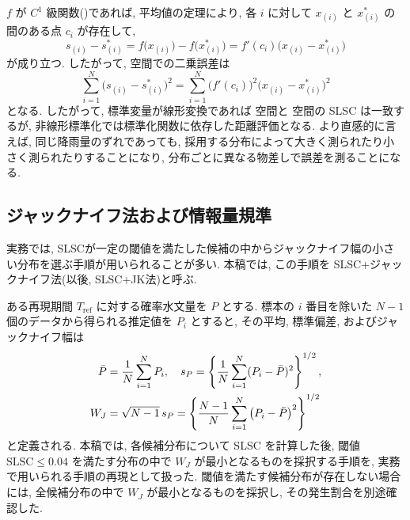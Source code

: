 $f$ が $C^1$ 級関数()であれば, 平均値の定理により, 各 $i$ に対して $x_{(i)}$ と $x_{(i)}^{\ast}$ の間のある点 $c_i$ が存在して,
\begin{equation}
s_{(i)}-s_{(i)}^{\ast} =
f\bigl(x_{(i)}\bigr)-f\bigl(x_{(i)}^{\ast}\bigr)
= f'(c_i)\bigl(x_{(i)}-x_{(i)}^{\ast}\bigr)
\label{eq:mvt}
\end{equation}
が成り立つ.
したがって, \Ssp 空間での二乗誤差は
\begin{equation}
\sum_{i=1}^{N}\bigl(s_{(i)}-s_{(i)}^{\ast}\bigr)^2
=
\sum_{i=1}^{N}\bigl(f'(c_i)\bigr)^2\bigl(x_{(i)}-x_{(i)}^{\ast}\bigr)^2
\label{eq:weightednorm}
\end{equation}
となる. 
したがって, 標準変量が線形変換であれば \Ssp 空間と \Xsp 空間の SLSC は一致するが, 非線形標準化では標準化関数に依存した距離評価となる.
より直感的に言えば, 同じ降雨量のずれであっても, 採用する分布によって大きく測られたり小さく測られたりすることになり, 分布ごとに異なる物差しで誤差を測ることになる.

\subsection{ジャックナイフ法および情報量規準}
実務では, SLSCが一定の閾値を満たした候補の中からジャックナイフ幅の小さい分布を選ぶ手順が用いられることが多い{\cite{Fujibe2011}}. 本稿では, この手順を SLSC+ジャックナイフ法(以後, SLSC+JK法)と呼ぶ.

ある再現期間 $T_{\mathrm{ref}}$ に対する確率水文量を $P$ とする. 標本の $i$ 番目を除いた $N-1$ 個のデータから得られる推定値を $P_i$ とすると, その平均, 標準偏差, およびジャックナイフ幅は
\begin{align}
\bar{P} &= \frac{1}{N}\sum_{i=1}^{N}P_i, \quad
s_P = \left\{\frac{1}{N}\sum_{i=1}^{N}(P_i-\bar{P})^2\right\}^{1/2}, \notag\\
W_J &= \sqrt{N-1}\,s_P
=
\left\{
\frac{N-1}{N}\sum_{i=1}^{N}\left(P_i-\bar{P}\right)^2
\right\}^{1/2}
\label{eq:jackwidth}
\end{align}
と定義される. 本稿では, 各候補分布について SLSC を計算した後, 閾値 $\mathrm{SLSC}\le 0.04$ を満たす分布の中で $W_J$ が最小となるものを採択する手順を, 実務で用いられる手順の再現として扱った.
閾値を満たす候補分布が存在しない場合には, 全候補分布の中で $W_J$ が最小となるものを採択し, その発生割合を別途確認した.

